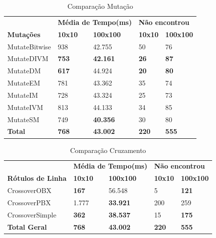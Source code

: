 \begin{table}[]
	\centering
	\caption{Comparação Mutação}
	\label{my-label}
	\begin{tabular}{lllll}
		& \multicolumn{2}{l}{\textbf{Média de Tempo(ms)}}              & \multicolumn{2}{l}{\textbf{Não encontrou}}              \\
		\textbf{Mutações} & \textbf{10x10}              & \textbf{100x100}               & \textbf{10x10}             & \textbf{100x100}           \\
		MutateBitwise     & 938                         & 42.755                         & 50                         & 76                         \\
		MutateDIVM        & \textbf{753} & \textbf{42.161} & \textbf{26} & \textbf{87} \\
		MutateDM          & \textbf{617} & 44.924                         & \textbf{20} & \textbf{80} \\
		MutateEM          & 781                         & 43.362                         & 35                         & 74                         \\
		MutateIM          & 728                         & 43.324                         & 25                         & 73                         \\
		MutateIVM         & 813                         & 44.133                         & 34                         & 85                         \\
		MutateSM          & 749                         & \textbf{40.356} & 30                         & 80                         \\
		\textbf{Total}    & \textbf{768}                & \textbf{43.002}                & \textbf{220}               & \textbf{555}              
	\end{tabular}
\end{table}

\begin{table}[]
	\centering
	\caption{Comparação Cruzamento}
	\label{my-label}
	\begin{tabular}{lllll}
		& \multicolumn{2}{l}{\textbf{Média de Tempo(ms)}}              & \multicolumn{2}{l}{\textbf{Não encontrou}}   \\
		\textbf{Rótulos de Linha} & \textbf{10x10}              & \textbf{100x100}               & \textbf{10x10} & \textbf{100x100}            \\
		CrossoverOBX              & \textbf{167} 				& 56.548                         & 5              & \textbf{121} \\
		CrossoverPBX              & 1.777                       & \textbf{33.921} & 200          & 259                         \\
		CrossoverSimple           & \textbf{362} 				& \textbf{38.537} & 15           & \textbf{175} \\
		\textbf{Total Geral}      & \textbf{768}                & \textbf{43.002}                & \textbf{220}   & \textbf{555}               
	\end{tabular}
\end{table}


